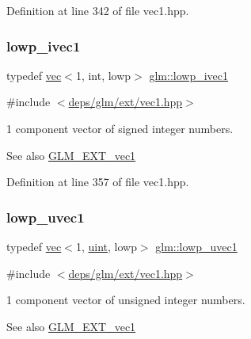 Definition at line 342 of file vec1.\+hpp.

\mbox{\label{group__ext__vec1_ga46adb8a3dcf2312c343a093c3bf372d7}} 
\subsubsection{\texorpdfstring{lowp\+\_\+ivec1}{lowp\_ivec1}}
{\footnotesize\ttfamily typedef \hyperlink{structglm_1_1vec}{vec}$<$1, int, lowp$>$ \hyperlink{group__ext__vec1_ga46adb8a3dcf2312c343a093c3bf372d7}{glm\+::lowp\+\_\+ivec1}}



{\ttfamily \#include $<$\hyperlink{ext_2vec1_8hpp}{deps/glm/ext/vec1.\+hpp}$>$}

1 component vector of signed integer numbers.

\begin{DoxySeeAlso}{See also}
\hyperlink{group__ext__vec1}{G\+L\+M\+\_\+\+E\+X\+T\+\_\+vec1} 
\end{DoxySeeAlso}


Definition at line 357 of file vec1.\+hpp.

\mbox{\label{group__ext__vec1_gaa8d9fb78600ac97161b79c2e83f5a30f}} 
\subsubsection{\texorpdfstring{lowp\+\_\+uvec1}{lowp\_uvec1}}
{\footnotesize\ttfamily typedef \hyperlink{structglm_1_1vec}{vec}$<$1, \hyperlink{group__core__precision_ga4fd29415871152bfb5abd588334147c8}{uint}, lowp$>$ \hyperlink{group__ext__vec1_gaa8d9fb78600ac97161b79c2e83f5a30f}{glm\+::lowp\+\_\+uvec1}}



{\ttfamily \#include $<$\hyperlink{ext_2vec1_8hpp}{deps/glm/ext/vec1.\+hpp}$>$}

1 component vector of unsigned integer numbers.

\begin{DoxySeeAlso}{See also}
\hyperlink{group__ext__vec1}{G\+L\+M\+\_\+\+E\+X\+T\+\_\+vec1} 
\end{DoxySeeAlso}


